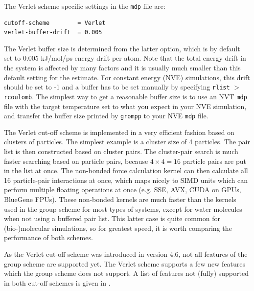 The Verlet scheme specific settings in the {\tt mdp} file are:
\begin{verbatim}
cutoff-scheme        = Verlet
verlet-buffer-drift  = 0.005
\end{verbatim}
The Verlet buffer size is determined from the latter option, which is
by default set to 0.005 kJ/mol/ps energy drift per atom. Note that the
total energy drift in the system is affected by many factors and it is
usually much smaller than this default setting for the estimate. For
constant energy (NVE) simulations, this drift should be set to -1 and
a buffer has to be set manually by specifying {\tt rlist} $>$ {\tt
  rcoulomb}. The simplest way to get a reasonable buffer size is to
use an NVT {\tt mdp} file with the target temperature set to what you
expect in your NVE simulation, and transfer the buffer size printed by
{\tt grompp} to your NVE {\tt mdp} file.

The Verlet cut-off scheme is implemented in a very efficient fashion
based on clusters of particles. The simplest example is a cluster size
of 4 particles. The pair list is then constructed based on cluster
pairs. The cluster-pair search is much faster searching based on
particle pairs, because $4 \times 4 = 16$ particle pairs are put in
the list at once. The non-bonded force calculation kernel can then
calculate all 16 particle-pair interactions at once, which maps nicely
to SIMD units which can perform multiple floating operations at once
(e.g. SSE, AVX, CUDA on GPUs, BlueGene FPUs). These non-bonded kernels
are much faster than the kernels used in the group scheme for most
types of systems, except for water molecules when not using a buffered
pair list. This latter case is quite common for (bio-)molecular
simulations, so for greatest speed, it is worth comparing the
performance of both schemes.

As the Verlet cut-off scheme was introduced in version 4.6, not
all features of the group scheme are supported yet. The Verlet scheme
supports a few new features which the group scheme does not support.
A list of features not (fully) supported in both cut-off schemes is
given in .

